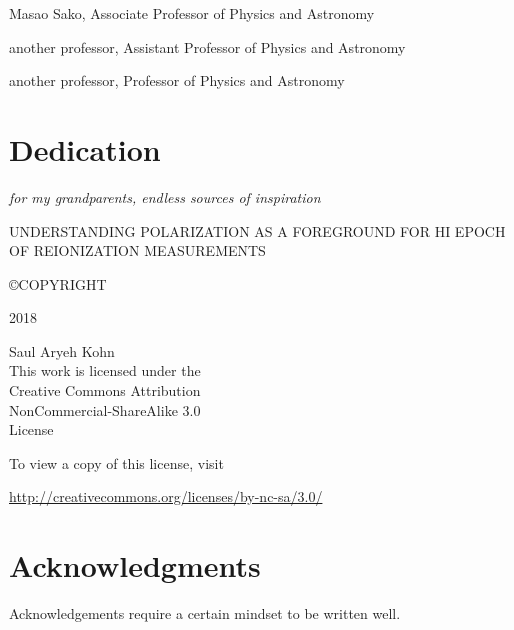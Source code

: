 \documentclass[12pt,twoside,openany]{book}
\makeatletter
\newcommand{\doublespaced}{\renewcommand{\baselinestretch}{2}\normalfont}
\newcommand{\halfspaced}{\renewcommand{\baselinestretch}{1.5}\normalfont}
\newcommand{\unchapter}[1]{%
  \begingroup
  \let\@makechapterhead\@gobble %
  \chapter{#1}
  \endgroup
}
\newcommand{\tita}{UNDERSTANDING POLARIZATION AS A FOREGROUND FOR HI EPOCH OF REIONIZATION MEASUREMENTS}
\makeatother
\begin{document}
\noindent Masao Sako, Associate Professor of Physics and Astronomy

\noindent another professor, Assistant Professor of Physics and Astronomy

\noindent another professor, Professor of Physics and Astronomy

\newpage

\pagestyle{plain}
\unchapter{Dedication}
\doublespaced
\vspace*{2in}
\begin{center}
{\large\emph{for my grandparents, endless sources of inspiration}}
\end{center}

\newpage


\thispagestyle{empty} %

\vspace*{\fill}

\begin{flushleft}
{\tita }

\copyright \space COPYRIGHT
 
2018

Saul Aryeh Kohn\\[24 pt] %

This work is licensed under the \\
Creative Commons Attribution \\
NonCommercial-ShareAlike 3.0 \\
License

To view a copy of this license, visit

\url{http://creativecommons.org/licenses/by-nc-sa/3.0/}
\end{flushleft}



\chapter{Acknowledgments}
\halfspaced
Acknowledgements require a certain mindset to be written well.


\end{document}
